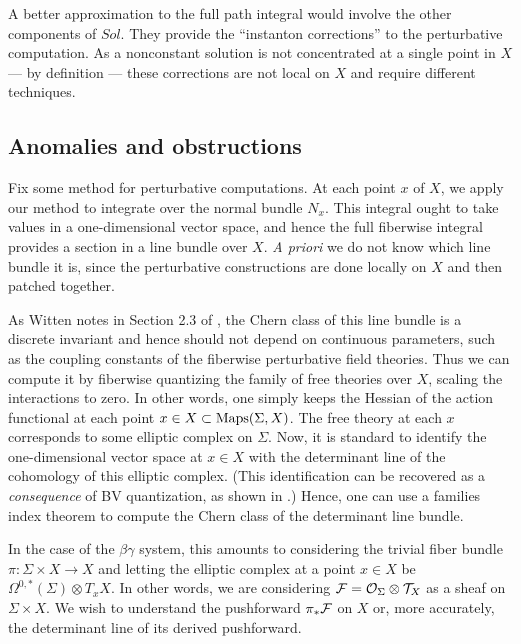 A better approximation to the full path integral would involve the other components of $Sol$. 
They provide the ``instanton corrections'' to the perturbative computation.
As a nonconstant solution is not concentrated at a single point in $X$ --- by definition --- 
these corrections are not local on $X$ and require different techniques.

\subsection{Anomalies and obstructions}

Fix some method for perturbative computations.
At each point $x$ of $X$, we apply our method to integrate over the normal bundle $N_x$.
This integral ought to take values in a one-dimensional vector space, and 
hence the full fiberwise integral provides a section in a line bundle over $X$.
{\em A priori} we do not know which line bundle it is, 
since the perturbative constructions are done locally on $X$ and then patched together.

As Witten notes in Section 2.3 of \cite{WittenCDO}, the Chern class of this line bundle is a discrete invariant and 
hence should not depend on continuous parameters, 
such as the coupling constants of the fiberwise perturbative field theories.
Thus we can compute it by fiberwise quantizing the family of free theories over $X$,
scaling the interactions to zero.
In other words, one simply keeps the Hessian of the action functional at each point $x \in X \subset {\rm Maps}(\Sigma,X)$.
The free theory at each $x$ corresponds to some elliptic complex on $\Sigma$. 
Now, it is standard to identify the one-dimensional vector space at $x \in X$ with the determinant line of the cohomology of this elliptic complex.
(This identification can be recovered as a {\em consequence} of BV quantization, as shown in \cite{HaugGwil}.)
Hence, one can use a families index theorem to compute the Chern class of the determinant line bundle.

In the case of the $\beta\gamma$ system, 
this amounts to considering the trivial fiber bundle $\pi: \Sigma \times X \to X$
and letting the elliptic complex at a point $x \in X$ be $\Omega^{0,*}(\Sigma) \otimes T_x X$.
In other words, we are considering $\mathcal F = \mathcal O_\Sigma \otimes \mathcal T_X$ as a sheaf on $\Sigma \times X$.
We wish to understand the pushforward $\pi_* \mathcal F$ on $X$ or, more accurately, the determinant line of its derived pushforward.

\def\Td{{\rm Td}}

